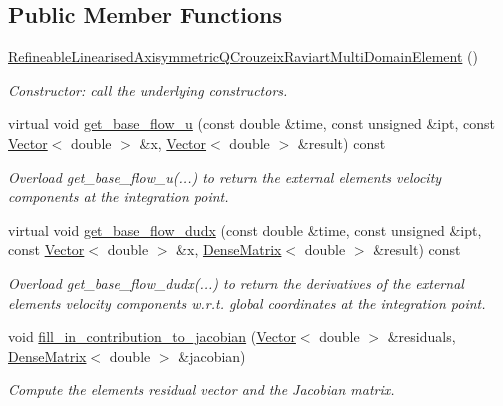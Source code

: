 \subsection*{Public Member Functions}
\begin{DoxyCompactItemize}
\item 
\hyperlink{classRefineableLinearisedAxisymmetricQCrouzeixRaviartMultiDomainElement_a28bb9ce4f05c21b8ddf02ab3516667e0}{Refineable\+Linearised\+Axisymmetric\+Q\+Crouzeix\+Raviart\+Multi\+Domain\+Element} ()
\begin{DoxyCompactList}\small\item\em Constructor\+: call the underlying constructors. \end{DoxyCompactList}\item 
virtual void \hyperlink{classRefineableLinearisedAxisymmetricQCrouzeixRaviartMultiDomainElement_a7c3e497fd77af087d4e9300810faf38e}{get\+\_\+base\+\_\+flow\+\_\+u} (const double \&time, const unsigned \&ipt, const \hyperlink{classoomph_1_1Vector}{Vector}$<$ double $>$ \&x, \hyperlink{classoomph_1_1Vector}{Vector}$<$ double $>$ \&result) const
\begin{DoxyCompactList}\small\item\em Overload get\+\_\+base\+\_\+flow\+\_\+u(...) to return the external element\textquotesingle{}s velocity components at the integration point. \end{DoxyCompactList}\item 
virtual void \hyperlink{classRefineableLinearisedAxisymmetricQCrouzeixRaviartMultiDomainElement_aa188100d2012d19360e60d514089cdd4}{get\+\_\+base\+\_\+flow\+\_\+dudx} (const double \&time, const unsigned \&ipt, const \hyperlink{classoomph_1_1Vector}{Vector}$<$ double $>$ \&x, \hyperlink{classoomph_1_1DenseMatrix}{Dense\+Matrix}$<$ double $>$ \&result) const
\begin{DoxyCompactList}\small\item\em Overload get\+\_\+base\+\_\+flow\+\_\+dudx(...) to return the derivatives of the external element\textquotesingle{}s velocity components w.\+r.\+t. global coordinates at the integration point. \end{DoxyCompactList}\item 
void \hyperlink{classRefineableLinearisedAxisymmetricQCrouzeixRaviartMultiDomainElement_a5040c64ce7752b950ee33fa18e8eb7c1}{fill\+\_\+in\+\_\+contribution\+\_\+to\+\_\+jacobian} (\hyperlink{classoomph_1_1Vector}{Vector}$<$ double $>$ \&residuals, \hyperlink{classoomph_1_1DenseMatrix}{Dense\+Matrix}$<$ double $>$ \&jacobian)
\begin{DoxyCompactList}\small\item\em Compute the element\textquotesingle{}s residual vector and the Jacobian matrix. \end{DoxyCompactList}\end{DoxyCompactItemize}

